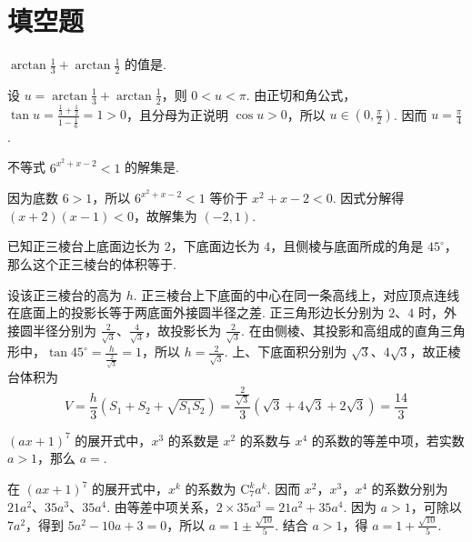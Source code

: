 \documentclass[UTF8,a4paper,oneside,11pt]{ctexbook}
\begin{document}
\section{填空题}

\begin{problem}
\(\arctan \frac{1}{3}+\arctan \frac{1}{2}\) 的值是\fillinblank{}.


\begin{solution}
设 \(u=\arctan\frac{1}{3}+\arctan\frac{1}{2}\)，则 \(0<u<\pi\). 由正切和角公式，\(\tan u=\frac{\frac13+\frac12}{1-\frac16}=1>0\)，且分母为正说明 \(\cos u>0\)，所以 \(u\in\left(0,\frac{\pi}{2}\right)\). 因而 \(u=\frac{\pi}{4}\).
\end{solution}
\end{problem}

\begin{problem}
不等式 \(6^{x^2+x-2}<1\) 的解集是\fillinblank{}.


\begin{solution}
因为底数 \(6>1\)，所以 \(6^{x^2+x-2}<1\) 等价于 \(x^2+x-2<0\). 因式分解得 \((x+2)(x-1)<0\)，故解集为 \(\left(-2,1\right)\).
\end{solution}
\end{problem}

\begin{problem}
已知正三棱台上底面边长为 \(2\)，下底面边长为 \(4\)，且侧棱与底面所成的角是 \(45^\circ\)，那么这个正三棱台的体积等于\fillinblank{}.


\begin{solution}
设该正三棱台的高为 \(h\). 正三棱台上下底面的中心在同一条高线上，对应顶点连线在底面上的投影长等于两底面外接圆半径之差. 正三角形边长分别为 \(2\)、\(4\) 时，外接圆半径分别为 \(\frac{2}{\sqrt3}\)、\(\frac{4}{\sqrt3}\)，故投影长为 \(\frac{2}{\sqrt3}\). 在由侧棱、其投影和高组成的直角三角形中，\(\tan45^\circ=\frac{h}{\frac{2}{\sqrt3}}=1\)，所以 \(h=\frac{2}{\sqrt3}\). 上、下底面积分别为 \(\sqrt3\)、\(4\sqrt3\)，故正棱台体积为
\[
V=\frac{h}{3}\left(S_1+S_2+\sqrt{S_1S_2}\right)=\frac{\frac{2}{\sqrt3}}{3}\left(\sqrt3+4\sqrt3+2\sqrt3\right)=\frac{14}{3}
\]
\end{solution}
\end{problem}

\begin{problem}
\(\left(ax+1\right)^7\) 的展开式中，\(x^3\) 的系数是 \(x^2\) 的系数与 \(x^4\) 的系数的等差中项，若实数 \(a>1\)，那么 \(a=\)\fillinblank{}.


\begin{solution}
在 \((ax+1)^7\) 的展开式中，\(x^k\) 的系数为 \(\mathrm C_7^k a^k\). 因而 \(x^2\)，\(x^3\)，\(x^4\) 的系数分别为 \(21a^2\)、\(35a^3\)、\(35a^4\). 由等差中项关系，\(2\times35a^3=21a^2+35a^4\). 因为 \(a>1\)，可除以 \(7a^2\)，得到 \(5a^2-10a+3=0\)，所以 \(a=1\pm\frac{\sqrt{10}}{5}\). 结合 \(a>1\)，得 \(a=1+\frac{\sqrt{10}}{5}\).
\end{solution}
\end{problem}
\end{document}
